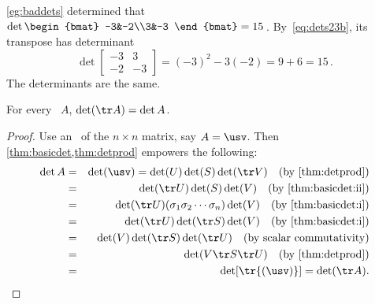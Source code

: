\begin{example} 
\cref{eg:baddets} determined that
\(\det\begin{bmat} -3&-2\\3&-3 \end{bmat}=15\)\,.
By~\eqref{eq:dets23b}, its transpose has determinant
\begin{equation*}
\det\begin{bmatrix} -3&3\\-2&-3 \end{bmatrix}
=(-3)^2-3(-2)=9+6=15\,.
\end{equation*}
The determinants are the same.
\end{example}




\begin{theorem} \label{thm:dettr} 
For every ~\(A\), \(\det(\tr A)=\det A\).
\end{theorem}
\begin{proof} 
Use an \svd\ of the \(n\times n\) matrix, say \(A=\usv\).
Then \cref{thm:basicdet,thm:detprod} empowers the following:
\begin{eqnarray*}
\det A&=&\det(\usv)
=\det(U)\det(S)\det(\tr V)\quad(\text{by \cref{thm:detprod}})
\\&=&\det(\tr U)\det(S)\det(V)\quad(\text{by \cref{thm:basicdet:ii}})
\\&=&\det(\tr U)(\sigma_1\sigma_2\cdots\sigma_n)\det(V)\quad(\text{by \cref{thm:basicdet:i}})
\\&=&\det(\tr U)\det(\tr S)\det(V)\quad(\text{by \cref{thm:basicdet:i}})
\\&=&\det(V)\det(\tr S)\det(\tr U)\quad(\text{by scalar commutativity})
\\&=&\det(V\tr S\tr U)\quad(\text{by \cref{thm:detprod}})
\\&=&\det[\tr{(\usv)}]=\det(\tr A).
\end{eqnarray*}
\end{proof}

